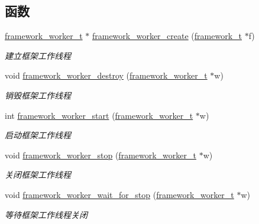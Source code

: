 \subsection*{函数}
\begin{DoxyCompactItemize}
\item 
\hyperlink{a00047_aeb7a44e6b579659a8aae81f3ab819af3_aeb7a44e6b579659a8aae81f3ab819af3}{framework\+\_\+worker\+\_\+t} $\ast$ \hyperlink{a00053_a0617a9e873aa183a3bb0cc33a542a8a1_a0617a9e873aa183a3bb0cc33a542a8a1}{framework\+\_\+worker\+\_\+create} (\hyperlink{a00047_a6149d769f6f07ed14a40a271c95d8463_a6149d769f6f07ed14a40a271c95d8463}{framework\+\_\+t} $\ast$f)
\begin{DoxyCompactList}\small\item\em 建立框架工作线程 \end{DoxyCompactList}\item 
void \hyperlink{a00053_a1f5d04499db3c8137c840c8c87cdba5e_a1f5d04499db3c8137c840c8c87cdba5e}{framework\+\_\+worker\+\_\+destroy} (\hyperlink{a00047_aeb7a44e6b579659a8aae81f3ab819af3_aeb7a44e6b579659a8aae81f3ab819af3}{framework\+\_\+worker\+\_\+t} $\ast$w)
\begin{DoxyCompactList}\small\item\em 销毁框架工作线程 \end{DoxyCompactList}\item 
int \hyperlink{a00053_a8030b85e272bfe80459bbecbca5cd9c0_a8030b85e272bfe80459bbecbca5cd9c0}{framework\+\_\+worker\+\_\+start} (\hyperlink{a00047_aeb7a44e6b579659a8aae81f3ab819af3_aeb7a44e6b579659a8aae81f3ab819af3}{framework\+\_\+worker\+\_\+t} $\ast$w)
\begin{DoxyCompactList}\small\item\em 启动框架工作线程 \end{DoxyCompactList}\item 
void \hyperlink{a00053_a52ecf94ed22881622a06600042ab1bb1_a52ecf94ed22881622a06600042ab1bb1}{framework\+\_\+worker\+\_\+stop} (\hyperlink{a00047_aeb7a44e6b579659a8aae81f3ab819af3_aeb7a44e6b579659a8aae81f3ab819af3}{framework\+\_\+worker\+\_\+t} $\ast$w)
\begin{DoxyCompactList}\small\item\em 关闭框架工作线程 \end{DoxyCompactList}\item 
void \hyperlink{a00053_a5af1821ad3a53ce7a9bd675a49c252e6_a5af1821ad3a53ce7a9bd675a49c252e6}{framework\+\_\+worker\+\_\+wait\+\_\+for\+\_\+stop} (\hyperlink{a00047_aeb7a44e6b579659a8aae81f3ab819af3_aeb7a44e6b579659a8aae81f3ab819af3}{framework\+\_\+worker\+\_\+t} $\ast$w)
\begin{DoxyCompactList}\small\item\em 等待框架工作线程关闭 \end{DoxyCompactList}\end{DoxyCompactItemize}


